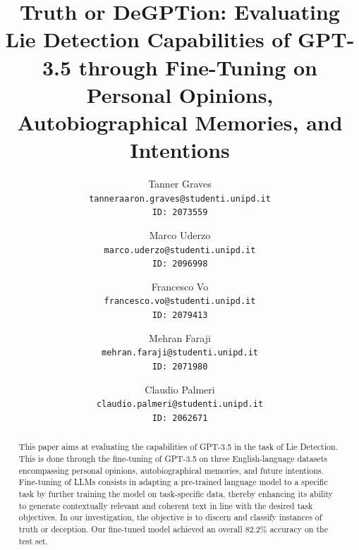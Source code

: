 \documentclass[10pt,twocolumn,letterpaper]{article}
\begin{document}
\title{Truth or DeGPTion: Evaluating Lie Detection Capabilities of GPT-3.5 through Fine-Tuning on Personal Opinions, Autobiographical Memories, and Intentions}


\author{
Tanner Graves\\
{\tt\small tanneraaron.graves@studenti.unipd.it} \\
{\tt\small ID: 2073559} \\
\and
Marco Uderzo\\
{\tt\small marco.uderzo@studenti.unipd.it} \\
{\tt\small ID: 2096998} \\
\and
Francesco Vo \\
{\tt\small francesco.vo@studenti.unipd.it} \\
{\tt\small ID: 2079413} \\
\and
Mehran Faraji\\
{\tt\small mehran.faraji@studenti.unipd.it} \\
{\tt\small ID: 2071980} \\
\and
Claudio Palmeri \\
{\tt\small claudio.palmeri@studenti.unipd.it} \\
{\tt\small ID: 2062671} \\
}

\maketitle


\begin{abstract}
This paper aims at evaluating the capabilities of GPT-3.5 in the task of Lie Detection.
This is done through the fine-tuning of GPT-3.5 on three English-language datasets encompassing 
personal opinions, autobiographical memories, and future intentions. 
Fine-tuning of LLMs consists in adapting a pre-trained language model to a specific 
task by further training the model on task-specific data, thereby 
enhancing its ability to generate contextually relevant and coherent text in 
line with the desired task objectives. In our investigation, the objective is to 
discern and classify instances of truth or deception.
Our fine-tuned model achieved an overall 82.2\% accuracy on the test set.

\end{abstract}

\end{document}
